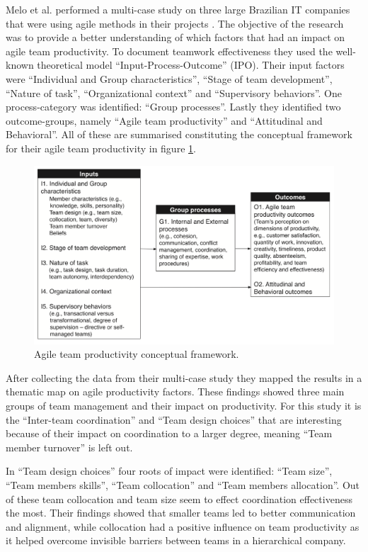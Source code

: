 Melo et al. performed a multi-case study on three large Brazilian IT companies that were using agile methods in their projects \cite{Melo2013}. The objective of the research was to provide a better understanding of which factors that had an impact on agile team productivity. To document teamwork effectiveness they used the well-known theoretical model ``Input-Process-Outcome'' (IPO). Their input factors were ``Individual and Group characteristics'', ``Stage of team development'', ``Nature of task'', ``Organizational context'' and ``Supervisory behaviors''. One process-category was identified: ``Group processes''. Lastly they identified two outcome-groups, namely ``Agile team productivity'' and ``Attitudinal and Behavioral''. All of these are summarised constituting the conceptual framework for their agile team productivity in figure \ref{atpcf}.

\begin{figure}
\centering
\includegraphics[width=150mm]{images/IPO.png}
\caption{Agile team productivity conceptual framework.}
\label{atpcf}
\end{figure}

After collecting the data from their multi-case study they mapped the results in a thematic map on agile productivity factors. These findings showed three main groups of team management and their impact on productivity. For this study it is the ``Inter-team coordination'' and ``Team design choices'' that are interesting because of their impact on coordination to a larger degree, meaning ``Team member turnover'' is left out. 

In ``Team design choices'' four roots of impact were identified: ``Team size'', ``Team members skills'', ``Team collocation'' and ``Team members allocation''. Out of these team collocation and team size seem to effect coordination effectiveness the most. Their findings showed that smaller teams led to better communication and alignment, while collocation had a positive influence on team productivity as it helped overcome invisible barriers between teams in a hierarchical company.

